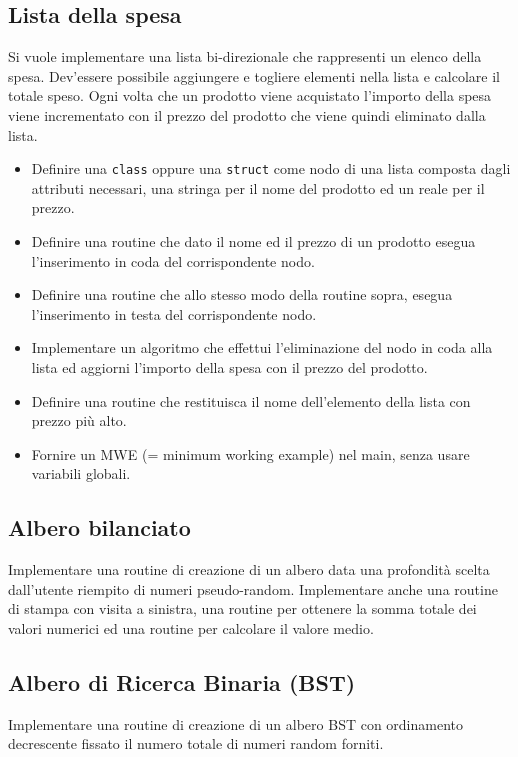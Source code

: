 \documentclass{article}
\begin{document}
\subsection{Lista della spesa}
Si vuole implementare una lista bi-direzionale che rappresenti un elenco della spesa. Dev'essere possibile aggiungere e togliere elementi nella lista e calcolare il totale speso. Ogni volta che un prodotto viene acquistato l'importo della spesa viene incrementato con il prezzo del prodotto che viene quindi eliminato dalla lista.
	\begin{itemize}
	\item Definire una \texttt{class} oppure una \texttt{struct} come nodo di una lista composta dagli attributi necessari, una stringa per il nome del prodotto ed un reale per il prezzo.
	\item Definire una routine che dato il nome ed il prezzo di un prodotto esegua l'inserimento in coda del corrispondente nodo.
	\item Definire una routine che allo stesso modo della routine sopra, esegua l'inserimento in testa del corrispondente nodo.
	\item Implementare un algoritmo che effettui l'eliminazione del nodo in coda alla lista ed aggiorni l'importo della spesa con il prezzo del prodotto.
	\item Definire una routine che restituisca il nome dell'elemento della lista con prezzo più alto.
	\item Fornire un MWE (= minimum working example) nel main, senza usare variabili globali.
	\end{itemize}

	
\subsection{Albero bilanciato}
Implementare una routine di creazione di un albero data una profondità scelta dall'utente riempito di numeri pseudo-random. Implementare anche una routine di stampa con visita a sinistra, una routine per ottenere la somma totale dei valori numerici ed una routine per calcolare il valore medio.

\subsection{Albero di Ricerca Binaria (BST)}
Implementare una routine di creazione di un albero BST con ordinamento decrescente fissato il numero totale di numeri random forniti.
\end{document}

